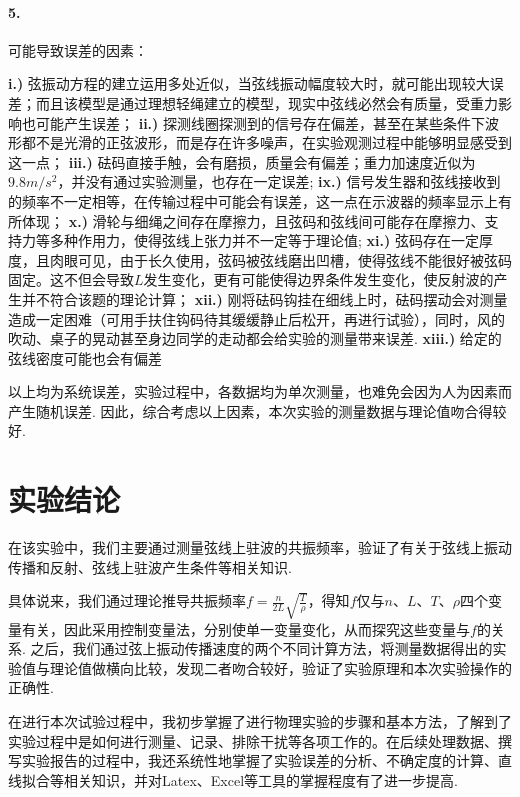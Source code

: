 \documentclass[UTF8]{ctexart}
\begin{document}
\paragraph{5.}可能导致误差的因素：\par
\textbf{i.)} 弦振动方程的建立运用多处近似，当弦线振动幅度较大时，就可能出现较大误差；而且该模型是通过理想轻绳建立的模型，现实中弦线必然会有质量，受重力影响也可能产生误差； \textbf{ii.)} 探测线圈探测到的信号存在偏差，甚至在某些条件下波形都不是光滑的正弦波形，而是存在许多噪声，在实验观测过程中能够明显感受到这一点；
\textbf{iii.)} 砝码直接手触，会有磨损，质量会有偏差；重力加速度近似为$9.8m/s^2$，并没有通过实验测量，也存在一定误差; \textbf{ix.)} 信号发生器和弦线接收到的频率不一定相等，在传输过程中可能会有误差，这一点在示波器的频率显示上有所体现； \textbf{x.)} 滑轮与细绳之间存在摩擦力，且弦码和弦线间可能存在摩擦力、支持力等多种作用力，使得弦线上张力并不一定等于理论值; \textbf{xi.)} 弦码存在一定厚度，且肉眼可见，由于长久使用，弦码被弦线磨出凹槽，使得弦线不能很好被弦码固定。这不但会导致$L$发生变化，更有可能使得边界条件发生变化，使反射波的产生并不符合该题的理论计算； \textbf{xii.)} 刚将砝码钩挂在细线上时，砝码摆动会对测量造成一定困难（可用手扶住钩码待其缓缓静止后松开，再进行试验），同时，风的吹动、桌子的晃动甚至身边同学的走动都会给实验的测量带来误差. \textbf{xiii.)} 给定的弦线密度可能也会有偏差\par
以上均为系统误差，实验过程中，各数据均为单次测量，也难免会因为人为因素而产生随机误差. 因此，综合考虑以上因素，本次实验的测量数据与理论值吻合得较好.

\section{实验结论}
	在该实验中，我们主要通过测量弦线上驻波的共振频率，验证了有关于弦线上振动传播和反射、弦线上驻波产生条件等相关知识.\par
	具体说来，我们通过理论推导共振频率$\displaystyle{f = \frac{n}{2L}\sqrt{\frac{T}{\rho}}}$，得知$f$仅与$n$、$L$、$T$、$\rho$四个变量有关，因此采用控制变量法，分别使单一变量变化，从而探究这些变量与$f$的关系. 之后，我们通过弦上振动传播速度的两个不同计算方法，将测量数据得出的实验值与理论值做横向比较，发现二者吻合较好，验证了实验原理和本次实验操作的正确性.\par
	在进行本次试验过程中，我初步掌握了进行物理实验的步骤和基本方法，了解到了实验过程中是如何进行测量、记录、排除干扰等各项工作的。在后续处理数据、撰写实验报告的过程中，我还系统性地掌握了实验误差的分析、不确定度的计算、直线拟合等相关知识，并对Latex、Excel等工具的掌握程度有了进一步提高.
\newpage
\end{document}

